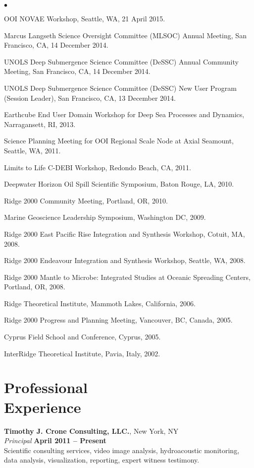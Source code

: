 \documentclass[11pt]{res}
\newenvironment{list2}{
  \begin{list}{$\bullet$}{%
      \setlength{\itemsep}{0in}
      \setlength{\parsep}{0in} \setlength{\parskip}{0in}
      \setlength{\topsep}{0in} \setlength{\partopsep}{0in} 
      \setlength{\leftmargin}{0.2in}}}{\end{list}}
\begin{document}
\begin{resume}
\begin{list2}
\item OOI NOVAE Workshop, Seattle, WA, 21 April 2015.
\item Marcus Langseth Science Oversight Committee (MLSOC) Annual Meeting, San Francisco, CA, 14 December 2014.
\item UNOLS Deep Submergence Science Committee (DeSSC) Annual Community Meeting, San Francisco, CA, 14 December 2014.
\item UNOLS Deep Submergence Science Committee (DeSSC) New User Program (Session Leader), San Francisco, CA, 13 December 2014.
\item Earthcube End User Domain Workshop for Deep Sea Processes and Dynamics, Narragansett, RI, 2013.
\item Science Planning Meeting for OOI Regional Scale Node at Axial Seamount, Seattle, WA, 2011.
\item Limits to Life C-DEBI Workshop, Redondo Beach, CA, 2011.
\item Deepwater Horizon Oil Spill Scientific Symposium, Baton Rouge, LA, 2010.
\item Ridge 2000 Community Meeting, Portland, OR, 2010.
\item Marine Geoscience Leadership Symposium, Washington DC, 2009.
\item Ridge 2000 East Pacific Rise Integration and Synthesis Workshop, Cotuit, MA, 2008.
\item Ridge 2000 Endeavour Integration and Synthesis Workshop, Seattle, WA, 2008.
\item Ridge 2000 Mantle to Microbe: Integrated Studies at Oceanic Spreading Centers, Portland, OR, 2008.
\item Ridge Theoretical Institute, Mammoth Lakes, California, 2006.
\item Ridge 2000 Progress and Planning Meeting, Vancouver, BC, Canada, 2005.
\item Cyprus Field School and Conference, Cyprus, 2005.
\item InterRidge Theoretical Institute, Pavia, Italy, 2002. 
\end{list2}

\section{\sc Professional\\Experience}

{\bf Timothy J. Crone Consulting, LLC.}, New York, NY\\
\textit{Principal} \hfill {\bf April 2011 -- Present}\\
Scientific consulting services, video image analysis, hydroacoustic monitoring,
data analysis, visualization, reporting, expert witness testimony.


\end{resume}
\end{document}
